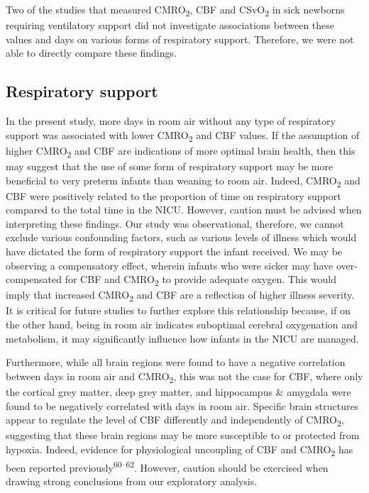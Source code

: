 \documentclass[
  letterpaper,
  DIV=11,
  numbers=noendperiod]{scrartcl}
\begin{document}
Two of the studies that measured CMRO\textsubscript{2}, CBF and
CSvO\textsubscript{2} in sick newborns requiring ventilatory support did
not investigate associations between these values and days on various
forms of respiratory support. Therefore, we were not able to directly
compare these findings.

\subsection{Respiratory support}\label{respiratory-support}

In the present study, more days in room air without any type of
respiratory support was associated with lower CMRO\textsubscript{2} and
CBF values. If the assumption of higher CMRO\textsubscript{2} and CBF
are indications of more optimal brain health, then this may suggest that
the use of some form of respiratory support may be more beneficial to
very preterm infants than weaning to room air. Indeed,
CMRO\textsubscript{2} and CBF were positively related to the proportion
of time on respiratory support compared to the total time in the NICU.
However, caution must be advised when interpreting these findings. Our
study was observational, therefore, we cannot exclude various
confounding factors, such as various levels of illness which would have
dictated the form of respiratory support the infant received. We may be
observing a compensatory effect, wherein infants who were sicker may
have over-compensated for CBF and CMRO\textsubscript{2} to provide
adequate oxygen. This would imply that increased CMRO\textsubscript{2}
and CBF are a reflection of higher illness severity. It is critical for
future studies to further explore this relationship because, if on the
other hand, being in room air indicates suboptimal cerebral oxygenation
and metabolism, it may significantly influence how infants in the NICU
are managed.

Furthermore, while all brain regions were found to have a negative
correlation between days in room air and CMRO\textsubscript{2}, this was
not the case for CBF, where only the cortical grey matter, deep grey
matter, and hippocampus \& amygdala were found to be negatively
correlated with days in room air. Specific brain structures appear to
regulate the level of CBF differently and independently of
CMRO\textsubscript{2}, suggesting that these brain regions may be more
susceptible to or protected from hypoxia. Indeed, evidence for
physiological uncoupling of CBF and CMRO\textsubscript{2} has been
reported previously\textsuperscript{60--62}. However, caution should be
exercised when drawing strong conclusions from our exploratory analysis.
\end{document}
